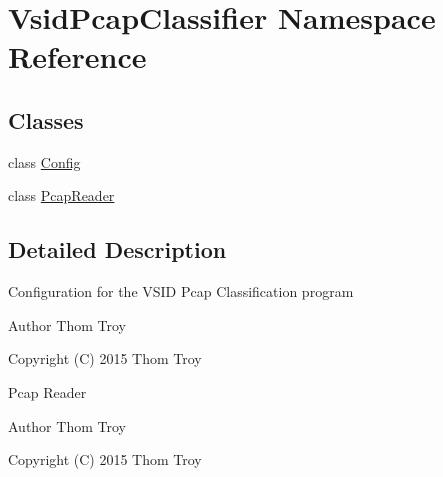 \hypertarget{namespace_vsid_pcap_classifier}{\section{Vsid\-Pcap\-Classifier Namespace Reference}
\label{namespace_vsid_pcap_classifier}
}
\subsection*{Classes}
\begin{DoxyCompactItemize}
\item 
class \hyperlink{class_vsid_pcap_classifier_1_1_config}{Config}
\item 
class \hyperlink{class_vsid_pcap_classifier_1_1_pcap_reader}{Pcap\-Reader}
\end{DoxyCompactItemize}


\subsection{Detailed Description}
Configuration for the V\-S\-I\-D Pcap Classification program

\begin{DoxyAuthor}{Author}
Thom Troy
\end{DoxyAuthor}
Copyright (C) 2015 Thom Troy

Pcap Reader

\begin{DoxyAuthor}{Author}
Thom Troy
\end{DoxyAuthor}
Copyright (C) 2015 Thom Troy 